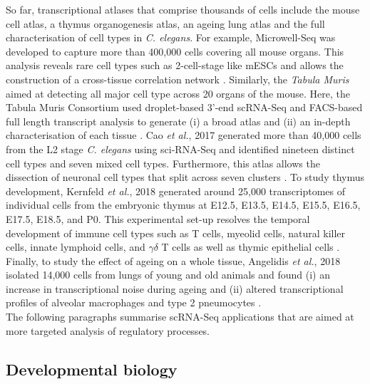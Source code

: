 So far, transcriptional atlases that comprise thousands of cells include the mouse cell atlas, a thymus organogenesis atlas, an ageing lung atlas and the full characterisation of cell types in \textit{C. elegans}. 
For example, Microwell-Seq was developed to capture more than 400,000 cells covering all mouse organs. 
This analysis reveals rare cell types such as 2-cell-stage like mESCs and allows the construction of a cross-tissue correlation network \cite{Han2018}. 
Similarly, the \emph{Tabula Muris} aimed at detecting all major cell type across 20 organs of the mouse. 
Here, the Tabula Muris Consortium used droplet-based 3'-end scRNA-Seq and FACS-based full length transcript analysis to generate (i) a broad atlas and (ii) an in-depth characterisation of each tissue \citep{Quake2018}. Cao \emph{et al.}, 2017 generated more than 40,000 cells from the L2 stage \emph{C. elegans} using sci-RNA-Seq and identified nineteen distinct cell types and seven mixed cell types. 
Furthermore, this atlas allows the dissection of neuronal cell types that split across seven clusters \citep{Cao2017}. 
To study thymus development, Kernfeld \emph{et al.}, 2018 generated around 25,000 transcriptomes of individual cells from the embryonic thymus at E12.5, E13.5, E14.5, E15.5, E16.5, E17.5, E18.5, and P0. 
This experimental set-up resolves the temporal development of immune cell types such as T cells, myeolid cells, natural killer cells, innate lymphoid cells, and $\gamma{}\delta{}$ T cells as well as thymic epithelial cells \citep{Kernfeld2018}. 
Finally, to study the effect of ageing on a whole tissue, Angelidis \emph{et al.}, 2018 isolated 14,000 cells from lungs of young and old animals and found (i) an increase in transcriptional noise during ageing and (ii) altered transcriptional profiles of alveolar macrophages and type 2 pneumocytes \citep{Angelidis2018}.\\

The following paragraphs summarise scRNA-Seq applications that are aimed at more targeted analysis of regulatory processes.

\subsection{Developmental biology}

